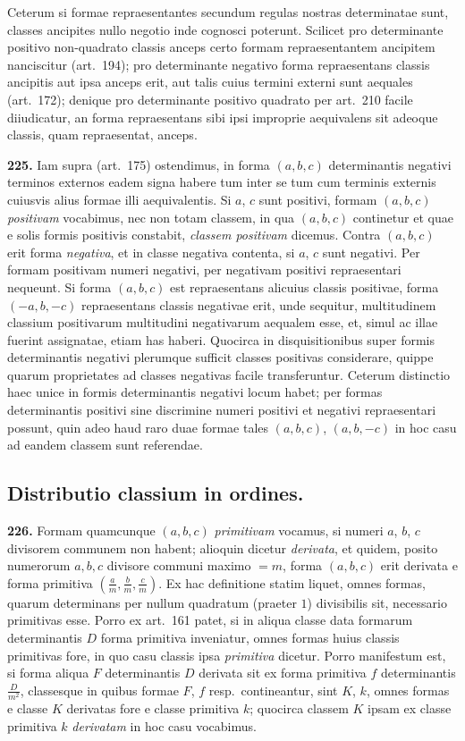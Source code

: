 \documentclass[12pt,a4paper]{article}
\theoremstyle{plain}
\theoremstyle{definition}
\theoremstyle{remark}
\begin{document}
Ceterum si formae repraesentantes secundum regulas nostras determinatae sunt, classes ancipites nullo negotio inde cognosci poterunt. Scilicet pro determinante positivo non-quadrato classis anceps certo formam repraesentantem ancipitem nanciscitur (art.\ 194); pro determinante negativo forma repraesentans classis ancipitis aut ipsa anceps erit, aut talis cuius termini externi sunt aequales (art.\ 172); denique pro determinante positivo quadrato per art.\ 210 facile diiudicatur, an forma repraesentans sibi ipsi improprie aequivalens sit adeoque classis, quam repraesentat, anceps.

\textbf{225.}
Iam supra (art.\ 175) ostendimus, in forma $(a,b,c)$ determinantis negativi terminos externos eadem signa habere tum inter se tum cum terminis externis cuiusvis alius formae illi aequivalentis. Si $a$, $c$ sunt positivi, formam $(a,b,c)$ \emph{positivam} vocabimus, nec non totam classem, in qua $(a,b,c)$ continetur et quae e solis formis positivis constabit, \emph{classem positivam} dicemus. Contra $(a,b,c)$ erit forma \emph{negativa}, et in classe negativa contenta, si $a$, $c$ sunt negativi. Per formam positivam numeri negativi, per negativam positivi repraesentari nequeunt. Si forma $(a,b,c)$ est repraesentans alicuius classis positivae, forma $(-a,b,-c)$ repraesentans classis negativae erit, unde sequitur, multitudinem classium positivarum multitudini negativarum aequalem esse, et, simul ac illae fuerint assignatae, etiam has haberi. Quocirca in disquisitionibus super formis determinantis negativi plerumque sufficit classes positivas considerare, quippe quarum proprietates ad classes negativas facile transferuntur. Ceterum distinctio haec unice in formis determinantis negativi locum habet; per formas determinantis positivi sine discrimine numeri positivi et negativi repraesentari possunt, quin adeo haud raro duae formae tales $(a,b,c)$, $(a,b,-c)$ in hoc casu ad eandem classem sunt referendae.


\subsection*{Distributio classium in ordines.}

\textbf{226.}
Formam quamcunque $(a,b,c)$ \emph{primitivam} vocamus, si numeri $a$, $b$, $c$ divisorem communem non habent; alioquin dicetur \emph{derivata}, et quidem, posito numerorum $a,b,c$ divisore communi maximo $=m$, forma $(a,b,c)$ erit derivata e forma primitiva $(\frac{a}{m},\frac{b}{m},\frac{c}{m})$. Ex hac definitione statim liquet, omnes formas, quarum determinans per nullum quadratum (praeter $1$) divisibilis sit, necessario primitivas esse. Porro ex art.\ 161 patet, si in aliqua classe data formarum determinantis $D$ forma primitiva inveniatur, omnes formas huius classis primitivas fore, in quo casu classis ipsa \emph{primitiva} dicetur. Porro manifestum est, si forma aliqua $F$ determinantis $D$ derivata sit ex forma primitiva $f$ determinantis $\frac{D}{m^2}$, classesque in quibus formae $F$, $f$ resp.\ contineantur, sint $K$, $k$, omnes formas e classe $K$ derivatas fore e classe primitiva $k$; quocirca classem $K$ ipsam ex classe primitiva $k$ \emph{derivatam} in hoc casu vocabimus.
\end{document}
